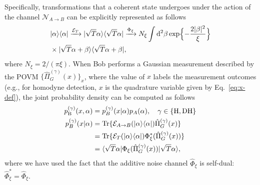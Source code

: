 \documentclass[%
reprint,
superscriptaddress,
 amsmath,amssymb,amsfonts,
 aps,
 pra,
 longbibliography
]{revtex4-2}
\newcommand{\ket}[1]{\ensuremath{|{#1}\rangle}}
\newcommand{\bra}[1]{\ensuremath{\langle{#1}|}}
\newcommand{\cnj}[1]{{#1}^{\ast}}
\newcommand{\Tr}{\mathop{\rm Tr}\nolimits}
\newcommand{\ind}[1]{\mathrm{#1}}
\newcommand{\dd}{\mathrm{d}}
\begin{document}
Specifically,
transformations that
a coherent state undergoes under the action
of the channel
$\mathcal{N}_{A\to B}$
can be explicitly represented as follows
\begin{align}
  &
  \label{eq:A-to-B-channel}
  \ket{\alpha}\bra{\alpha}\xrightarrow{\mathcal{E}_T}
  \ket{\sqrt{T}\alpha}\bra{\sqrt{T}\alpha}
    \xrightarrow{\Phi_{\xi}}
    N_{\xi}\int\dd^2\beta
    \exp\Bigl\{
    -\frac{2|\beta|^2}{\xi}\Bigr\}
    \notag
  \\
  &
    \times\ket{\sqrt{T}\alpha+\beta}\bra{\sqrt{T}\alpha+\beta},
\end{align}
where $N_\xi=2/(\pi\xi)$.
When Bob performs a Gaussian measurement described by the POVM
$\{\hat{\Pi}_G^{(\gamma)}(x)\}_x$,
where the value of $x$ labels the measurement outcomes
(e.g., for homodyne detection, $x$ is the quadrature variable
given by Eq.~\eqref{eq:x-def}),
the joint probability density can be computed as follows
\begin{subequations}
  \label{eq:P_x-alpha}
\begin{align}
\label{eq:pB(xA)}
  p_{\ind{B}}^{(\gamma)}(x,\alpha) & = p_B^{(\gamma)}(x|\alpha) p_A(\alpha),\quad
                                     \gamma\in\{\ind{H},\ind{DH}\}
  \\
    \label{eq:p_B-cond}
    p_B^{(\gamma)}(x|\alpha)& =\Tr\{\mathcal{E}_{A\to B}(\ket{\alpha}\bra{\alpha})\hat{\Pi}_G^{(\gamma)}(x)\}
    \notag
  \\
  &
    =\Tr\{\mathcal{E}_{T}(\ket{\alpha}\bra{\alpha})\cnj{\Phi}_{\xi}(\hat{\Pi}_G^{(\gamma)}(x))\}
    \notag
  \\
  &
=
    \bra{\sqrt{T}\alpha}\Phi_{\xi}(\hat{\Pi}_G^{(\gamma)}(x))\ket{\sqrt{T}\alpha},
\end{align}
\end{subequations}
where we have used the fact that the additive noise channel $\hat{\Phi}_{\xi}$ is self-dual:
$\cnj{\hat{\Phi}}_{\xi}=\hat{\Phi}_{\xi}$.
\end{document}
